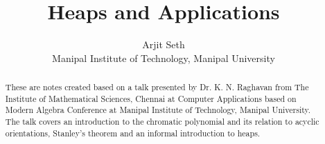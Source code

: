 \documentclass[svgnames]{article}
\theoremstyle{definition}
\theoremstyle{remark}
\theoremstyle{underline}
\theoremstyle{underline}
\begin{document}
	
	\title{\textbf{Heaps and Applications}}

	\author{\small Arjit Seth \\ \small Manipal Institute of Technology, Manipal University}
	\date{}
	\maketitle
	
	\renewcommand{\abstractname}{Context}
	\begin{abstract}
	\noindent These are notes created based on a talk presented by Dr. K. N. Raghavan from The Institute of Mathematical Sciences, Chennai at Computer Applications based on Modern Algebra Conference at Manipal Institute of Technology, Manipal University. The talk covers an introduction to the chromatic polynomial and its relation to acyclic orientations, Stanley's theorem and an informal introduction to heaps.  
	\end{abstract}
	
	\begingroup
	\let\clearpage\relax
	\tableofcontents
	\endgroup
\end{document}
